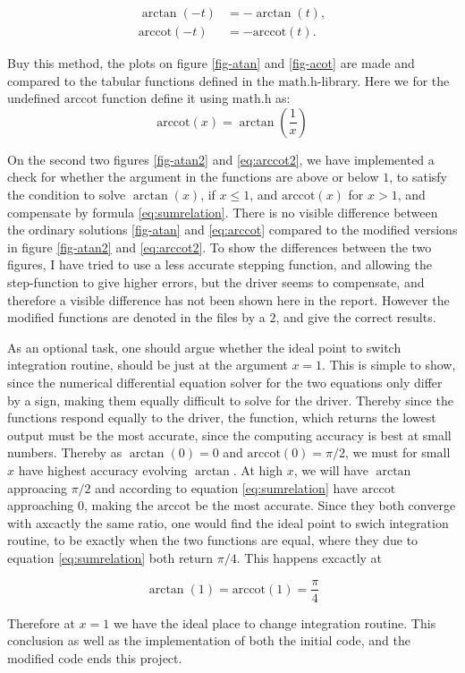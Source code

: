 \documentclass[twocolumn]{article}
\begin{document}
\begin{align}
\arctan(-t) &= - \arctan(t), \\
\mathrm{arccot}(-t) &= - \mathrm{arccot}(t).
\end{align} 

Buy this method, the plots on figure \ref{fig-atan} and \ref{fig-acot} are made and compared to the tabular functions defined in the $\mathrm{math.h}$-library. Here we for the undefined $\mathrm{arccot}$ function define it using $\mathrm{math.h}$ as:
\begin{equation}
\mathrm{arccot}(x) = \arctan \left( \frac{1}{x} \right)
\end{equation}

On the second two figures \ref{fig-atan2} and \ref{eq:arccot2}, we have implemented a check for whether the argument in the functions are above or below $1$, to satisfy the condition to solve $\arctan(x)$, if $x \leq 1$, and $\mathrm{arccot}(x)$ for $x>1$, and compensate by formula \eqref{eq:sumrelation}. There is no visible difference between the ordinary solutions \ref{fig-atan} and \ref{eq:arccot} compared to the modified versions in figure \ref{fig-atan2} and \ref{eq:arccot2}. To show the differences between the two figures, I have tried to use a less accurate stepping function, and allowing the step-function to give higher errors, but the driver seems to compensate, and therefore a visible difference has not been shown here in the report. However the modified functions are denoted in the files by a $2$, and give the correct results. 


As an optional task, one should argue whether the ideal point to switch integration routine, should be just at the argument $x=1$. This is simple to show, since the numerical differential equation solver for the two equations only differ by a sign, making them equally difficult to solve for the driver. Thereby since the functions respond equally to the driver, the function, which returns the lowest output must be the most accurate, since the computing accuracy is best at small numbers. Thereby as $\arctan (0)= 0$ and $\mathrm{arccot}(0) = \pi /2$, we must for small $x$ have highest accuracy evolving $\arctan$. At high $x$, we will have $\arctan$ approacing $\pi /2$ and according to equation \eqref{eq:sumrelation} have $\mathrm{arccot}$ approaching $0$, making the $\mathrm{arccot}$ be the most accurate. Since they both converge with axcactly the same ratio, one would find the ideal point to swich integration routine, to be exactly when the two functions are equal, where they due to equation \eqref{eq:sumrelation} both return $\pi/4$. This happens excactly at

\begin{equation}
\arctan(1) = \mathrm{arccot}(1) = \frac{\pi}{4}
\end{equation}

Therefore at $x=1$ we have the ideal place to change integration routine. This conclusion as well as the implementation of both the initial code, and the modified code ends this project.  
\end{document}

